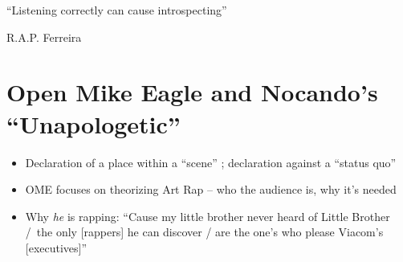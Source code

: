 
\epigraph{{``Listening correctly can cause introspecting''}}{R.A.P. Ferreira}

\section{Open Mike Eagle and Nocando's ``Unapologetic''}

\begin{itemize}
    \item Declaration of a place within a ``scene'' ; declaration against a ``status quo''
    \item OME focuses on theorizing Art Rap -- who the audience is, why it's needed
    \item Why \emph{he} is rapping: ``Cause my little brother never heard of Little Brother /\textellipsis~the only [rappers] he can discover / are the one's who please Viacom's [executives]''
\end{itemize}

